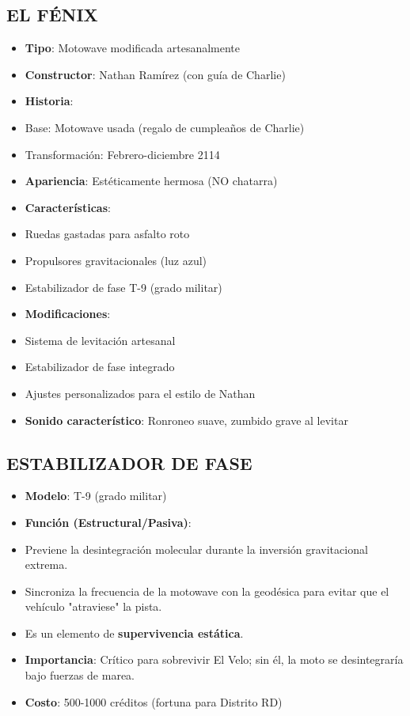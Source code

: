 \documentclass[11pt,a4paper]{report}
\begin{document}
\subsection{EL FÉNIX}
\begin{itemize}
  \item \textbf{Tipo}: Motowave modificada artesanalmente
  \item \textbf{Constructor}: Nathan Ramírez (con guía de Charlie)
  \item \textbf{Historia}: 
  \item Base: Motowave usada (regalo de cumpleaños de Charlie)
  \item Transformación: Febrero-diciembre 2114
  \item \textbf{Apariencia}: Estéticamente hermosa (NO chatarra)
  \item \textbf{Características}:
  \item Ruedas gastadas para asfalto roto
  \item Propulsores gravitacionales (luz azul)
  \item Estabilizador de fase T-9 (grado militar)
  \item \textbf{Modificaciones}:
  \item Sistema de levitación artesanal
  \item Estabilizador de fase integrado
  \item Ajustes personalizados para el estilo de Nathan
  \item \textbf{Sonido característico}: Ronroneo suave, zumbido grave al levitar

\end{itemize}
\subsection{ESTABILIZADOR DE FASE}
\begin{itemize}
  \item \textbf{Modelo}: T-9 (grado militar)
  \item \textbf{Función (Estructural/Pasiva)}: 
  \item Previene la desintegración molecular durante la inversión gravitacional extrema.
  \item Sincroniza la frecuencia de la motowave con la geodésica para evitar que el vehículo "atraviese" la pista.
  \item Es un elemento de \textbf{supervivencia estática}.
  \item \textbf{Importancia}: Crítico para sobrevivir El Velo; sin él, la moto se desintegraría bajo fuerzas de marea.
  \item \textbf{Costo}: 500-1000 créditos (fortuna para Distrito RD)

\end{itemize}
\end{document}
